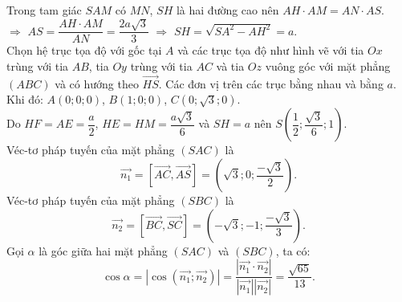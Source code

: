 \begin{ex}
{{
		}
		Trong tam giác $SAM$ có $MN$, $SH$ là hai đường cao nên $AH\cdot AM=AN\cdot AS$.\\
		$\Rightarrow$ $AS=\dfrac{AH\cdot AM}{AN}=\dfrac{2a\sqrt{3}}{3}$
		$\Rightarrow$ $SH=\sqrt{SA^2-AH^2}=a$.\\
		Chọn hệ trục tọa độ với gốc tại $A$ và các trục tọa độ như hình vẽ với tia $Ox$ trùng với tia $AB$, tia $Oy$ trùng với tia $AC$ và tia $Oz$ vuông góc với mặt phẳng $(ABC)$ và có hướng theo $\vec{HS}$. Các đơn vị trên các trục bằng nhau và bằng $a$.\\
		Khi đó: $A(0;0;0)$, $B(1;0;0)$, $C(0;\sqrt{3};0)$.\\
		Do $HF=AE=\dfrac{a}{2}$, $HE=HM=\dfrac{a\sqrt{3}}{6}$ và $SH=a$ nên $S\left(\dfrac{1}{2};\dfrac{\sqrt{3}}{6};1\right)$.\\
		Véc-tơ pháp tuyến của mặt phẳng $(SAC)$ là $$\vec{n_1}=[\vec{AC},\vec{AS}]=\left(\sqrt{3};0;\dfrac{-\sqrt{3}}{2}\right).$$
		Véc-tơ pháp tuyến của mặt phẳng $(SBC)$ là $$\vec{n_2}=[\vec{BC},\vec{SC}]=\left(-\sqrt{3};-1;\dfrac{-\sqrt{3}}{3}\right).$$
		Gọi $\alpha$ là góc giữa hai mặt phẳng $(SAC)$ và $(SBC)$, ta có: $$\cos \alpha=|\cos (\vec{n_1};\vec{n_2})|=\dfrac{|\vec{n_1}\cdot\vec{n_2}|}{|\vec{n_1}||\vec{n_2}|}=\dfrac{\sqrt{65}}{13}.$$
	}
\end{ex}
